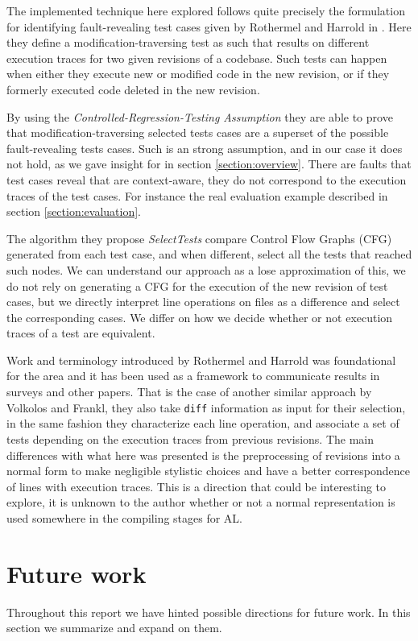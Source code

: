 \documentclass{article}
\begin{document}
The implemented technique here explored follows quite precisely the formulation for identifying fault-revealing test cases given by Rothermel and Harrold in \cite{TODO}. Here they define a modification-traversing test as such that results on different execution traces for two given revisions of a codebase. Such tests can happen when either they execute new or modified code in the new revision, or if they formerly executed code deleted in the new revision.

By using the \emph{Controlled-Regression-Testing Assumption} they are able to prove that modification-traversing selected tests cases are a superset of the possible fault-revealing tests cases. Such is an strong assumption, and in our case it does not hold, as we gave insight for in section \ref{section:overview}. There are faults that test cases reveal that are context-aware, they do not correspond to the execution traces of the test cases. For instance the real evaluation example described in section \ref{section:evaluation}.

The algorithm they propose \emph{SelectTests} compare Control Flow Graphs (CFG) generated from each test case, and when different, select all the tests that reached such nodes. We can understand our approach as a lose approximation of this, we do not rely on generating a CFG for the execution of the new revision of test cases, but we directly interpret line operations on files as a difference and select the corresponding cases. We differ on how we decide whether or not execution traces of a test are equivalent.

Work and terminology introduced by Rothermel and Harrold was foundational for the area and it has been used as a framework to communicate results in surveys and other papers. That is the case of another similar approach by Volkolos and Frankl, they also take \texttt{diff} information as input for their selection, in the same fashion they characterize each line operation, and associate a set of tests depending on the execution traces from previous revisions. The main differences with what here was presented is the preprocessing of revisions into a normal form to make negligible stylistic choices and have a better correspondence of lines with execution traces. This is a direction that could be interesting to explore, it is unknown to the author whether or not a normal representation is used somewhere in the compiling stages for AL.



\section{Future work}\label{section:future-work}
Throughout this report we have hinted possible directions for future work. In this section we summarize and expand on them. 
\end{document}
